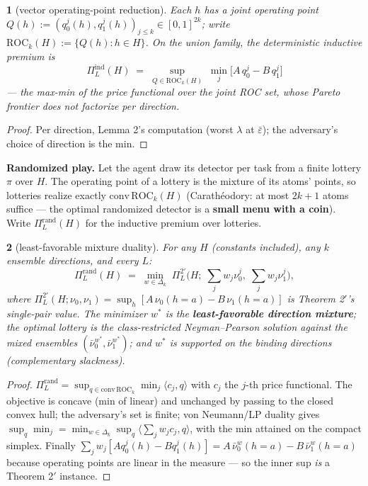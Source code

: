 \documentclass[11pt]{article}
\theoremstyle{plain}
\newtheorem*{namedthminner}{\namedthmname}
\newenvironment{nthm}[1]{\def\namedthmname{#1}\begin{namedthminner}}{\end{namedthminner}}
\theoremstyle{definition}
\begin{document}
\begin{nthm}{Lemma 3}[vector operating-point reduction]
Each $h$ has a joint
operating point $Q(h) := (q_0^j(h), q_1^j(h))_{j \leq k} \in [0,1]^{2k}$;
write $\mathrm{ROC}_k(H) := \{Q(h) : h \in H\}$. On the union family, the
deterministic inductive premium is
$$\Pi^{\mathrm{ind}}_L(H) \;=\; \sup_{Q \in \mathrm{ROC}_k(H)}\; \min_j \big[ A\,q_0^j - B\,q_1^j \big]$$
--- the max-min of the price functional over the joint ROC set, whose Pareto
frontier does not factorize per direction.
\end{nthm}

\begin{proof}
Per direction, Lemma 2's computation (worst $\lambda$ at
$\bar\varepsilon$); the adversary's choice of direction is the min.
\end{proof}

\textbf{Randomized play.} Let the agent draw its detector per task from a finite
lottery $\pi$ over $H$. The operating point of a lottery is the mixture of
its atoms' points, so lotteries realize exactly
$\mathrm{conv}\,\mathrm{ROC}_k(H)$ (Carath\'eodory: at most $2k+1$ atoms
suffice --- the optimal randomized detector is a \textbf{small menu with a coin}).
Write $\Pi^{\mathrm{rand}}_L(H)$ for the inductive premium over lotteries.

\begin{nthm}{Theorem M}[least-favorable mixture duality]
For any $H$ (constants
included), any $k$ ensemble directions, and every $L$:
$$\Pi^{\mathrm{rand}}_L(H) \;=\; \min_{w \in \Delta_k}\; \Pi^{2'}_L\!\Big(H;\; \sum_j w_j \nu_0^j,\; \sum_j w_j \nu_1^j\Big),$$
where $\Pi^{2'}_L(H; \nu_0, \nu_1) = \sup_h [A\,\nu_0(h{=}a) -
B\,\nu_1(h{=}a)]$ is Theorem 2$'$'s single-pair value. The minimizer $w^*$
is the \textbf{least-favorable direction mixture}; the optimal lottery is the
class-restricted Neyman--Pearson solution against the mixed ensembles
$(\bar\nu_0^{w^*}, \bar\nu_1^{w^*})$; and $w^*$ is supported on the
binding directions (complementary slackness).
\end{nthm}

\begin{proof}
$\Pi^{\mathrm{rand}}_L = \sup_{q \in \mathrm{conv}\,\mathrm{ROC}_k}
\min_j \langle c_j, q\rangle$ with $c_j$ the $j$-th price functional. The
objective is concave (min of linear) and unchanged by passing to the closed
convex hull; the adversary's set is finite; von Neumann/LP duality gives
$\sup_q \min_j = \min_{w \in \Delta_k} \sup_q \langle \sum_j w_j c_j,
q\rangle$, with the min attained on the compact simplex. Finally
$\sum_j w_j [A q_0^j(h) - B q_1^j(h)] = A\,\bar\nu_0^w(h{=}a) -
B\,\bar\nu_1^w(h{=}a)$ because operating points are linear in the measure ---
so the inner sup \emph{is} a Theorem 2$'$ instance.
\end{proof}
\end{document}
